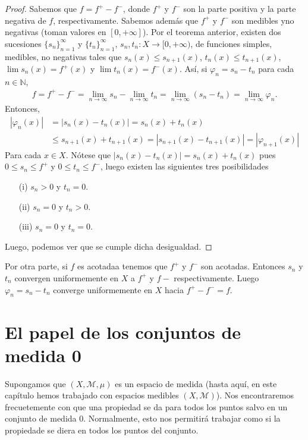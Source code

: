 \begin{proof}
    Sabemos que $f = f^+ - f^-$, donde $f^+$ y $f^-$ son la parte positiva y la parte negativa de $f$, respectivamente. Sabemos además que $f^+$ y $f^-$ son medibles yno negativas (toman valores en $[0, +\infty]$). Por el teorema anterior, existen dos sucesiones $\{ s_n \}_{n=1}^{\infty}$ y $\{ t_n \}_{n=1}^{\infty}$, $s_n,t_n: X \longrightarrow [0,+\infty)$, de funciones simples, medibles, no negativas tales que $s_n(x) \leq s_{n+1}(x)$, $t_n(x) \leq t_{n+1}(x)$, $\lim{s_n(x)} = f^+(x)$ y $\lim{t_n(x)} = f^-(x)$. Así, si $\varphi_n = s_n - t_n$ para cada $n \in \mathbb{N}$,
    \begin{align*}
        f = f^+ - f^- = \lim_{n \to \infty}{s_n} - \lim_{n \to \infty}{t_n} = \lim_{n \to \infty}{(s_n - t_n)} = \lim_{n \to \infty}{\varphi_n}.
    \end{align*}
    Entonces,
    \begin{align*}
        |\varphi_n(x)| & = |s_n(x) - t_n(x)| = s_n(x) + t_n(x)                                        \\
                       & \leq s_{n+1}(x) + t_{n+1}(x) = |s_{n+1}(x)- t_{n+1}(x)| = |\varphi_{n+1}(x)|
    \end{align*}
    Para cada $x \in X$. Nótese que $|s_n(x) - t_n(x)| = s_n(x) + t_n(x)$ pues $0 \leq s_n \leq f^+$ y $0 \leq t_n \leq f^-$, luego existen las siguientes tres posibilidades
    \begin{enumerate}
        \item[(i)]  $s_n > 0$ y $t_n = 0$.
        \item[(ii)] $s_n = 0$ y $t_n > 0$.
        \item[(iii)] $s_n = 0$ y $t_n = 0$.
    \end{enumerate}
    Luego, podemos ver que se cumple dicha desigualdad.
\end{proof}

Por otra parte, si $f$ es acotadaa tenemos que $f^+$ y $f^-$ son acotadas. Entonces $s_n$  y $t_n$ convergen uniformemente en $X$ a $f^+$ y $f-$ respectivamente. Luego $\varphi_n = s_n - t_n$ converge uniformemente en $X$ hacia $f^+ - f^- = f$.

\section{El papel de los conjuntos de medida 0}

Supongamos que $(X, \mathcal{M}, \mu)$ es un espacio de medida (hasta aquí, en este capítulo hemos trabajado con espacios medibles $(X, \mathcal{M})$). Nos encontraremos frecuetemente con que una propiedad se da para todos los puntos salvo en un conjunto de medida 0. Normalmente, esto nos permitirá trabajar como si la propiedade se diera en todos los puntos del conjunto.


